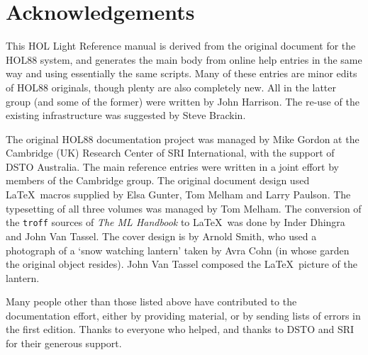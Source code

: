 \chapter*{Acknowledgements}

This HOL Light Reference manual is derived from the original {\REFERENCE}
document for the HOL88 system, and generates the main body from online help
entries in the same way and using essentially the same scripts. Many of these
entries are minor edits of HOL88 originals, though plenty are also completely
new. All in the latter group (and some of the former) were written by John
Harrison. The re-use of the existing infrastructure was suggested by Steve 
Brackin.

The original HOL88 documentation project was managed by Mike Gordon at the
Cambridge (UK) Research Center of SRI International, with the support of DSTO
Australia. The main reference entries were written in a joint effort by members
of the Cambridge {\HOL} group. The original document design used \LaTeX\ macros
supplied by Elsa Gunter, Tom Melham and Larry Paulson.  The typesetting of all
three volumes was managed by Tom Melham. The conversion of the {\tt troff}
sources of {\sl The ML Handbook\/} to \LaTeX\ was done by Inder Dhingra and
John Van Tassel. The cover design is by Arnold Smith, who used a photograph of
a `snow watching lantern' taken by Avra Cohn (in whose garden the original
object resides). John Van Tassel composed the \LaTeX\ picture of the lantern.

Many people other than those listed above have contributed to the {\HOL}
documentation effort, either by providing material, or by sending lists of
errors in the first edition.  Thanks to everyone who helped, and thanks to DSTO
and SRI for their generous support.
